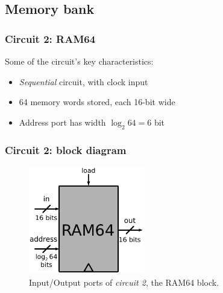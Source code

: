     \subsection{Memory bank}
    \label{subsec:memory-bank}
        \begin{frame}
            \frametitle{Circuit 2: RAM64}

            \par{Some of the circuit's key characteristics:}

            \begin{itemize}
                \item \emph{Sequential} circuit, with clock input
                \item 64 memory words stored, each 16-bit wide
                \item Address port has width $\log_{2} 64 = 6$ bit
            \end{itemize}

        \end{frame}

        \begin{frame}
            \frametitle{Circuit 2: block diagram}

            \begin{figure}[h!]
                \centerline{\includegraphics[width=0.45\textwidth]{imgs/ram-block.pdf}}
                \caption{Input/Output ports of \emph{circuit 2}, the RAM64 block.
                    \label{fig:ram-block}}
            \end{figure}
        \end{frame}

